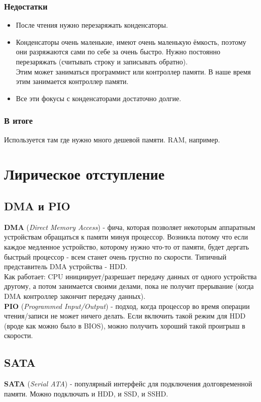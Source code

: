 \documentclass[12pt, a4paper]{article}
\begin{document}
\subsubsection{Недостатки}
\begin{itemize}
    \item После чтения нужно перезаряжать конденсаторы.
    \item Конденсаторы очень маленькие, имеют очень маленькую ёмкость, поэтому они разряжаются сами по себе за очень быстро. Нужно постоянно перезаряжать (считывать строку и записывать обратно).\\
    Этим может заниматься программист или контроллер памяти. В наше время этим занимается контроллер памяти.
    \item Все эти фокусы с конденсаторами достаточно долгие.
\end{itemize}
\subsubsection{В итоге}
Используется там где нужно много дешевой памяти. RAM, например.
\section{Лирическое отступление}
\subsection{DMA и PIO}
\textbf{DMA} (\textit{Direct Memory Access}) - фича, которая позволяет некоторым аппаратным устройствам обращаться к памяти минуя процессор. Возникла потому что если каждое медленное устройство, которому нужно что-то от памяти, будет дергать быстрый процессор - всем станет очень грустно по скорости. Типичный представитель DMA устройства - HDD.\\
Как работает: CPU инициирует/разрешает передачу данных от одного устройства другому, а потом занимается своими делами, пока не получит прерывание (когда DMA контроллер закончит передачу данных).\\
\textbf{PIO} (\textit{Programmed Input/Output}) - подход, когда процессор во время операции чтения/записи не может ничего делать. Если включить такой режим для HDD (вроде как можно было в BIOS), можно получить хороший такой проигрыш в скорости.
\subsection{SATA}
\textbf{SATA} (\textit{Serial ATA}) - популярный интерфейс для подключения долговременной памяти. Можно подключать и HDD, и SSD, и SSHD.
\end{document}
